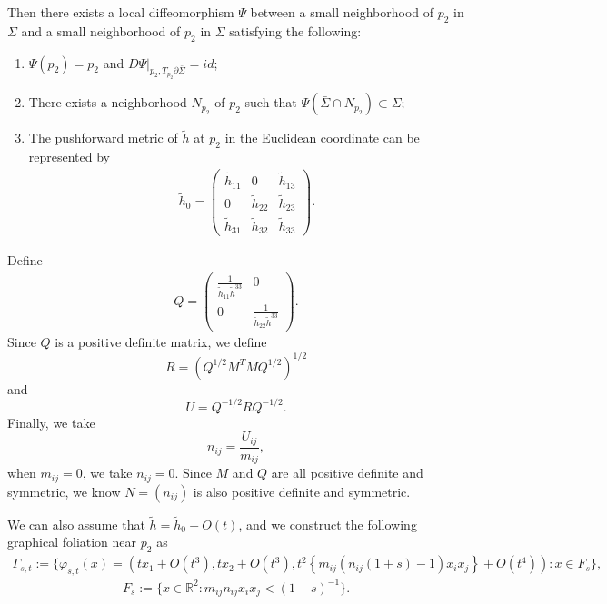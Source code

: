 \documentclass[11pt,letterpaper]{amsart}
\begin{document}
Then there exists a local diffeomorphism $\Psi$ between a small neighborhood of $p_2$ in $\bar{\Sigma}$ and a small neighborhood of $p_2$ in $\Sigma$ satisfying the following:
    \begin{enumerate}
        \item $\Psi(p_2)=p_2$ and $D\Psi|_{p_2,T_{p_2}\partial \bar{\Sigma}}=id$;
        \item There exists a neighborhood $N_{p_{2}}$ of $p_{2}$ such that $\Psi ( \bar{\Sigma} \cap N_{p_{2}})\subset \Sigma$;
        \item The pushforward metric of $\tilde{h}$ at $p_2$ in the Euclidean coordinate can be represented by
        \begin{align}
        \tilde{h}_0=\left(\begin{matrix}
            \tilde{h}_{11} & 0 & \tilde{h}_{13}\\
            0 & \tilde{h}_{22} & \tilde{h}_{23}\\
            \tilde{h}_{31} & \tilde{h}_{32} & \tilde{h}_{33}
        \end{matrix}\right).
        \end{align}
    \end{enumerate}


Define 
    \begin{align*}
        Q=\left(\begin{matrix}
            \frac{1}{\tilde{h}_{11}\tilde{h}^{33}} &0 \\
            0 & \frac{1}{\tilde{h}_{22}\tilde{h}^{33}}
        \end{matrix}\right).
    \end{align*}
     Since $Q$ is a positive definite matrix, we define 
    \[
    R=\left(Q^{1/2}M^{T}MQ^{1/2}\right)^{1/2}
    \]
    and
    \[
    U=Q^{-1/2}RQ^{-1/2}.
    \]
   Finally, we take
    \[
   n_{ij}=\frac{U_{ij}}{m_{ij}},
    \]
    when $m_{ij}=0$, we take $n_{ij}=0$.
    Since $M$ and $Q$ are all positive definite and symmetric, we know $N=(n_{ij})$ is also positive definite and symmetric.

We can also assume that $\tilde{h}=\tilde{h}_0+O(t)$, and we construct the following graphical foliation near $p_2$ as
\begin{align}
    \Gamma_{s,t}:=\{\varphi_{s,t}(x)=(tx_1+O(t^3),tx_2+O(t^3),t^2\left\{m_{ij}(n_{ij}(1+s)-1)x_ix_j\right\}+O(t^4)): x\in F_s\},
\end{align}
\[
F_s:=\{x\in\mathbb R^2: m_{ij}n_{ij}x_ix_j<(1+s)^{-1}\}.
\]
\end{document}
